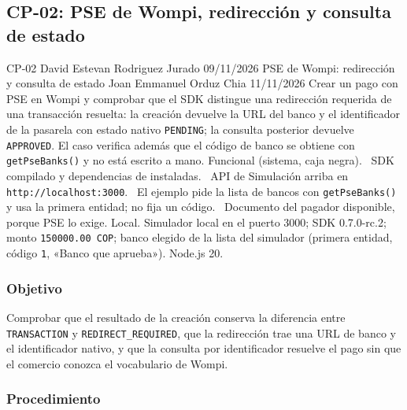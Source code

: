 \subsection{CP-02: PSE de Wompi, redirección y consulta de estado}
\label{sec:cp02}

\FichaCaso
  {CP-02}
  {David Estevan Rodriguez Jurado}
  {09/11/2026}
  {PSE de Wompi: redirección y consulta de estado}
  {Joan Emmanuel Orduz Chia}
  {11/11/2026}
  {Crear un pago con PSE en Wompi y comprobar que el SDK distingue una redirección requerida de una transacción resuelta: la creación devuelve la URL del banco y el identificador de la pasarela con estado nativo \texttt{PENDING}; la consulta posterior devuelve \texttt{APPROVED}. El caso verifica además que el código de banco se obtiene con \texttt{getPseBanks()} y no está escrito a mano.}
  {Funcional (sistema, caja negra).}
  {\textbullet\ SDK compilado y dependencias de  instaladas.\newline
   \textbullet\ API de Simulación arriba en \texttt{http://localhost:3000}.\newline
   \textbullet\ El ejemplo pide la lista de bancos con \texttt{getPseBanks()} y usa la primera entidad; no fija un código.\newline
   \textbullet\ Documento del pagador disponible, porque PSE lo exige.}
  {Local. Simulador local en el puerto 3000; SDK 0.7.0-rc.2; monto \texttt{150000.00 COP}; banco elegido de la lista del simulador (primera entidad, código \texttt{1}, «Banco que aprueba»). Node.js 20.}

\subsubsection{Objetivo}

Comprobar que el resultado de la creación conserva la diferencia entre \texttt{TRANSACTION} y \texttt{REDIRECT\_REQUIRED}, que la redirección trae una URL de banco y el identificador nativo, y que la consulta por identificador resuelve el pago sin que el comercio conozca el vocabulario de Wompi.

\subsubsection{Procedimiento}

